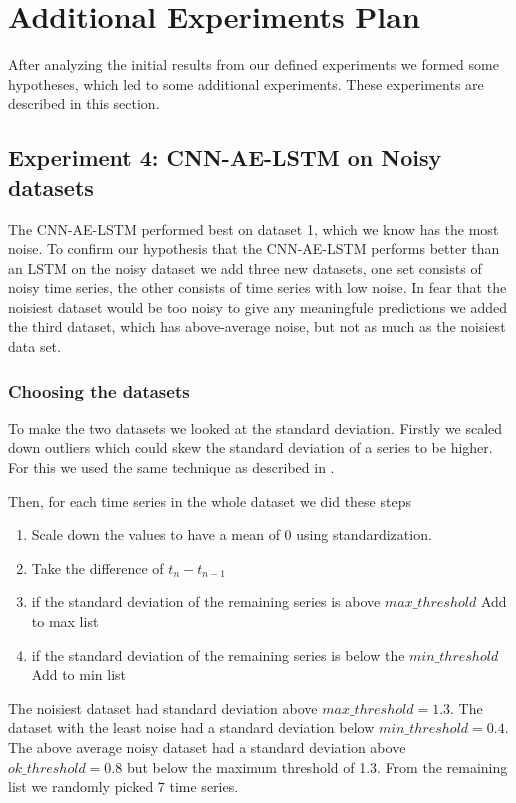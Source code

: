 \section{Additional Experiments Plan}
After analyzing the initial results from our defined experiments
we formed some hypotheses, which led to some additional experiments.
These experiments are described in this section.

\subsection{Experiment 4: CNN-AE-LSTM on Noisy datasets}
The CNN-AE-LSTM performed best on dataset 1, which we know
has the most noise. To confirm our hypothesis
that the CNN-AE-LSTM performs better than an LSTM
on the noisy dataset we add three new datasets,
one set consists of noisy time series,
the other consists of time series with low noise.
In fear that the noisiest dataset would be too noisy to give any meaningfule
predictions we added the third dataset, which has above-average noise, but not
as much as the noisiest data set.


\subsubsection{Choosing the datasets}
To make the two datasets we looked at the standard deviation.
Firstly we scaled down outliers which could skew the standard deviation of
a series to be higher. For this we used the same technique
as described in .

Then, for each time series in the whole dataset we did these steps
\begin{enumerate}
  \item Scale down the values to have a mean of 0 using standardization.
  \item Take the difference of $t_n - t_{n-1}$
  \item if the standard deviation of the remaining series is above $max\_threshold$ \-\> Add to max list
  \item if the standard deviation of the remaining series is below the $min\_threshold$ \-\> Add to min list
\end{enumerate}

The noisiest dataset had standard deviation above $max\_threshold = 1.3$.
The dataset with the least noise had a standard deviation below $min\_threshold = 0.4$.
The above average noisy dataset had a standard deviation above $ok\_threshold = 0.8$
but below the maximum threshold of 1.3.
From the remaining list we randomly picked 7 time series.

